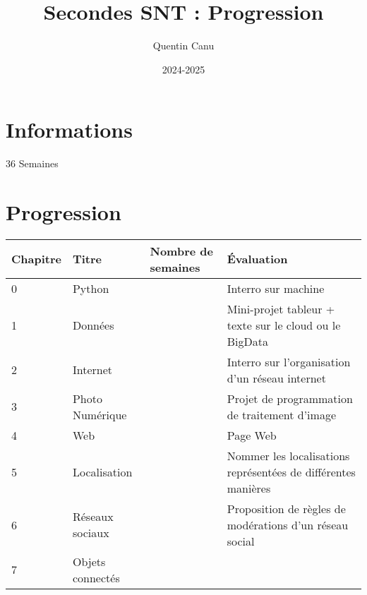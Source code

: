 \documentclass{article}
\title{Secondes SNT : Progression}
\author{Quentin Canu}
\date{2024-2025}
\begin{document}
\maketitle

\section{Informations}

36 Semaines

\section{Progression}

\begin{center}
    
\begin{tabular}{|l|p{4cm}|p{2cm}|p{2cm}|}
\hline
Chapitre
    & 
Titre
        & 
Nombre de semaines
            &
Évaluation\\
\hline
0   &
Python
        &

            &
Interro sur machine\\
\hline
1   &
Données
        &

            &
Mini-projet tableur + texte sur le cloud ou le BigData\\
\hline
2   &
Internet
        &
            
            &
Interro sur l'organisation d'un réseau internet\\
\hline
3   &
Photo Numérique
        &

            &
Projet de programmation de traitement d'image\\
\hline
4   &
Web     &

            &
Page Web\\
\hline
5   &
Localisation
        &

            &
Nommer les localisations représentées de différentes manières\\
\hline
6   &
Réseaux sociaux
        &

            &
Proposition de règles de modérations d'un réseau social\\
\hline
7   &
Objets connectés
        &

            &
\\
\hline
\end{tabular}
\end{center}
\end{document}
